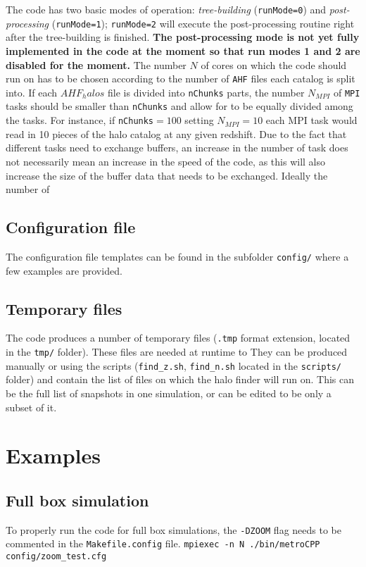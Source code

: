 \documentclass{article}
\begin{document}
The code has two basic modes of operation: \emph{tree-building} (\texttt{runMode=0}) and \emph{post-processing}
(\texttt{runMode=1}); \texttt{runMode=2} will execute the post-processing routine right after the tree-building is finished.
\textbf{The post-processing mode is not yet fully implemented in the code at the moment so that run modes 1 and 2 are disabled 
for the moment.}
The number $N$ of cores on which the code should run on has to be chosen according to the number of \texttt{AHF} files each catalog
is split into. If each $AHF_halos$ file is divided into \texttt{nChunks} parts, the number $N_{MPI}$ 
of \texttt{MPI} tasks should be smaller than \texttt{nChunks} and allow for to be equally divided among the tasks.
For instance, if \texttt{nChunks}$=100$ setting $N_{MPI} = 10$ each MPI task would read in 10 pieces of the 
halo catalog at any given redshift.
Due to the fact that different tasks need to exchange buffers, an increase in the number of task does not necessarily mean
an increase in the speed of the code, as this will also increase the size of the buffer data that needs to be exchanged.
Ideally the number of 



\subsection{Configuration file}

The configuration file templates can be found in the subfolder \texttt{config/} where a few examples are provided. 

\subsection{Temporary files}

The code produces a number of temporary files (\texttt{.tmp} format extension, located in the \texttt{tmp/} folder).
These files are needed at runtime to 
They can be produced manually or using the scripts (\texttt{find\_z.sh}, \texttt{find\_n.sh} located in the \texttt{scripts/} folder)
and contain the list of files on which the halo finder will run on.
This can be the full list of snapshots in one simulation, or can be edited to be only a subset of it.

\section{Examples}

\subsection{Full box simulation}
To properly run the code for full box simulations, the \texttt{-DZOOM} flag needs to be commented in the \texttt{Makefile.config} file.
\texttt{mpiexec -n N ./bin/metroCPP config/zoom\_test.cfg}
\end{document}
